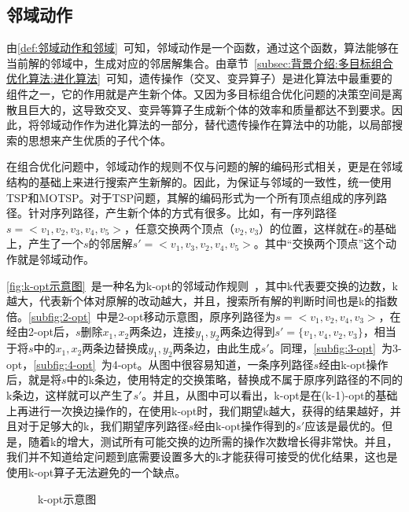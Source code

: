\subsection{邻域动作}
\label{subsec:背景介绍:局部搜索:邻域动作}
由\autoref{def:邻域动作和邻域}~可知，邻域动作是一个函数，通过这个函数，算法能够在当前解的邻域中，生成对应的邻居解集合。由章节~\ref{subsec:背景介绍:多目标组合优化算法:进化算法}~可知，遗传操作（交叉、变异算子）是进化算法中最重要的组件之一，它的作用就是产生新个体。又因为多目标组合优化问题的决策空间是离散且巨大的，这导致交叉、变异等算子生成新个体的效率和质量都达不到要求。因此，将邻域动作作为进化算法的一部分，替代遗传操作在算法中的功能，以局部搜索的思想来产生优质的子代个体。
\par
在组合优化问题中，邻域动作的规则不仅与问题的解的编码形式相关，更是在邻域结构的基础上来进行搜索产生新解的。因此，为保证与邻域的一致性，统一使用TSP和MOTSP。对于TSP问题，其解的编码形式为一个所有顶点组成的序列路径。针对序列路径，产生新个体的方式有很多。比如，有一序列路径$s = <v_1, v_2, v_3, v_4, v_5>$，任意交换两个顶点（$v_2, v_3$）的位置，这样就在$s$的基础上，产生了一个$s$的邻居解$s' = <v_1, v_3, v_2, v_4, v_5>$。其中“交换两个顶点”这个动作就是邻域动作。
\par
\autoref{fig:k-opt示意图}~是一种名为k-opt的邻域动作规则\cite{helsgaun2006effective}~，其中k代表要交换的边数，k越大，代表新个体对原解的改动越大，并且，搜索所有解的判断时间也是k的指数倍。\autoref{subfig:2-opt}~中是2-opt移动示意图，原序列路径为$s=<v_1, v_2, v_4, v_3>$，在经由2-opt后，$s$删除$x_1, x_2$两条边，连接$y_1, y_2$两条边得到$s'=\{ v_1, v_4, v_2, v_3 \}$，相当于将$s$中的$x_1, x_2$两条边替换成$y_1, y_2$两条边，由此生成$s'$。同理，\autoref{subfig:3-opt}~为3-opt，\autoref{subfig:4-opt}~为4-opt。从图中很容易知道，一条序列路径$s$经由k-opt操作后，就是将$s$中的k条边，使用特定的交换策略，替换成不属于原序列路径的不同的k条边，这样就可以产生了$s'$。并且，从图中可以看出，k-opt是在(k-1)-opt的基础上再进行一次换边操作的，在使用k-opt时，我们期望k越大，获得的结果越好，并且对于足够大的k，我们期望序列路径$s$经由k-opt操作得到的$s'$应该是最优的。但是，随着k的增大，测试所有可能交换的边所需的操作次数增长得非常快。并且，我们并不知道给定问题到底需要设置多大的k才能获得可接受的优化结果，这也是使用k-opt算子无法避免的一个缺点。
\begin{figure}[htb]
    \quad
    \quad
    \caption[k-opt示意图]{k-opt示意图}
    \label{fig:k-opt示意图}
\end{figure}

